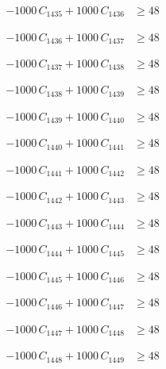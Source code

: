 \documentclass[a4paper,11pt]{article}
\begin{document}
\begin{align}
-1000\,C_{1435} + 1000\,C_{1436} &\geq 48 \nonumber
\end{align}

\begin{align}
-1000\,C_{1436} + 1000\,C_{1437} &\geq 48 \nonumber
\end{align}

\begin{align}
-1000\,C_{1437} + 1000\,C_{1438} &\geq 48 \nonumber
\end{align}

\begin{align}
-1000\,C_{1438} + 1000\,C_{1439} &\geq 48 \nonumber
\end{align}

\begin{align}
-1000\,C_{1439} + 1000\,C_{1440} &\geq 48 \nonumber
\end{align}

\begin{align}
-1000\,C_{1440} + 1000\,C_{1441} &\geq 48 \nonumber
\end{align}

\begin{align}
-1000\,C_{1441} + 1000\,C_{1442} &\geq 48 \nonumber
\end{align}

\begin{align}
-1000\,C_{1442} + 1000\,C_{1443} &\geq 48 \nonumber
\end{align}

\begin{align}
-1000\,C_{1443} + 1000\,C_{1444} &\geq 48 \nonumber
\end{align}

\begin{align}
-1000\,C_{1444} + 1000\,C_{1445} &\geq 48 \nonumber
\end{align}

\begin{align}
-1000\,C_{1445} + 1000\,C_{1446} &\geq 48 \nonumber
\end{align}

\begin{align}
-1000\,C_{1446} + 1000\,C_{1447} &\geq 48 \nonumber
\end{align}

\begin{align}
-1000\,C_{1447} + 1000\,C_{1448} &\geq 48 \nonumber
\end{align}

\begin{align}
-1000\,C_{1448} + 1000\,C_{1449} &\geq 48 \nonumber
\end{align}
\end{document}
